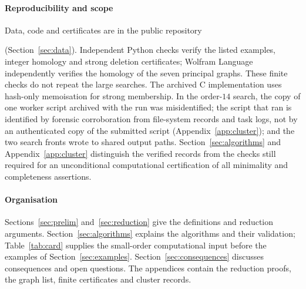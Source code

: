 \paragraph{Reproducibility and scope}
Data, code and certificates are in the public repository
\begin{center}\small\repo\end{center}
(Section~\ref{sec:data}). Independent Python checks verify the listed examples, integer homology and strong deletion certificates; Wolfram Language independently verifies the homology of the seven principal graphs. These finite checks do not repeat the large searches. The archived C implementation uses hash-only memoisation for strong membership. In the order-$14$ search, the copy of one worker script archived with the run was misidentified; the script that ran is identified by forensic corroboration from file-system records and task logs, not by an authenticated copy of the submitted script (Appendix~\ref{app:cluster}); and the two search fronts wrote to shared output paths. Section~\ref{sec:algorithms} and Appendix~\ref{app:cluster} distinguish the verified records from the checks still required for an unconditional computational certification of all minimality and completeness assertions.

\paragraph{Organisation}
Sections~\ref{sec:prelim} and~\ref{sec:reduction} give the definitions and reduction arguments. Section~\ref{sec:algorithms} explains the algorithms and their validation; Table~\ref{tab:card} supplies the small-order computational input before the examples of Section~\ref{sec:examples}. Section~\ref{sec:consequences} discusses consequences and open questions. The appendices contain the reduction proofs, the graph list, finite certificates and cluster records.
